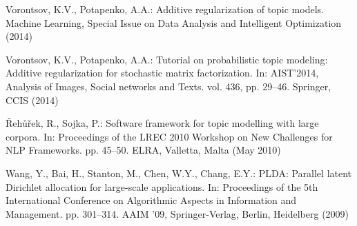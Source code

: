 \documentclass[russian,english]{llncs}
\begin{document}
\begin{thebibliography}{10}
Vorontsov, K.V., Potapenko, A.A.: Additive regularization of topic models.
  Machine Learning, Special Issue on Data Analysis and Intelligent Optimization
   (2014)

Vorontsov, K.V., Potapenko, A.A.: Tutorial on probabilistic topic modeling:
  Additive regularization for stochastic matrix factorization. In: AIST'2014,
  Analysis of Images, Social networks and Texts. vol. 436, pp. 29--46. 
  Springer, CCIS (2014)

\v{R}eh\r{u}\v{r}ek, R., Sojka, P.: Software framework for topic modelling with
  large corpora. In: Proceedings of the {LREC} 2010 Workshop on New Challenges
  for {NLP} Frameworks. pp. 45--50. {ELRA}, Valletta, Malta (May 2010)

Wang, Y., Bai, H., Stanton, M., Chen, W.Y., Chang, E.Y.: {PLDA}: Parallel
  latent {D}irichlet allocation for large-scale applications. In: Proceedings
  of the 5th International Conference on Algorithmic Aspects in Information and
  Management. pp. 301--314. AAIM '09, Springer-Verlag, Berlin, Heidelberg
  (2009)

\end{thebibliography}
\end{document}
